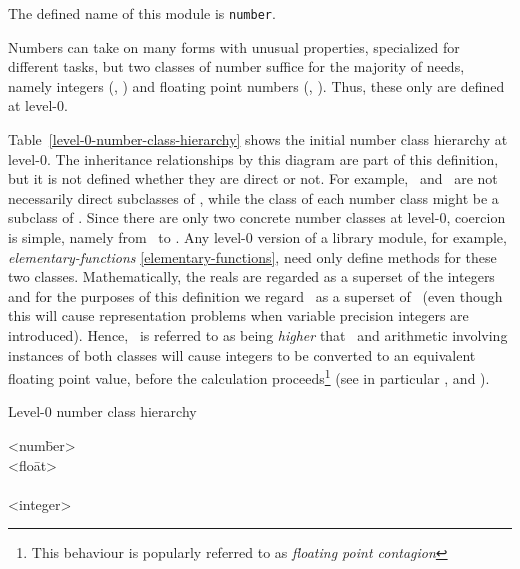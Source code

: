 \begin{optDefinition}
\noindent
The defined name of this module is {\tt number}.

Numbers can take on many forms with unusual properties, specialized for
different tasks, but two classes of number suffice for the majority of needs,
namely integers (, ) and floating point
numbers (, ).  Thus, these only are
defined at level-0.

Table~\ref{level-0-number-class-hierarchy} shows the initial number class
hierarchy at level-0.  The inheritance relationships by this diagram are part of
this definition, but it is not defined whether they are direct or not.  For
example, \ and \ are not necessarily direct
subclasses of , while the class of each number class might be a
subclass of .  Since there are only two concrete number
classes at level-0,
coercion is simple,
namely from \ to .  Any
level-0 version of a library module, for example, {\em elementary-functions}
\ref{elementary-functions}, need only define methods for these two classes.
Mathematically, the reals are regarded as a superset of the integers and for the
purposes of this definition we regard \ as a superset of
\ (even though this will cause representation problems when
variable precision integers are introduced).  Hence, \ is
referred to as being {\em higher} that \ and arithmetic
involving instances of both classes will cause integers to be converted to an
equivalent floating point value, before the calculation proceeds\footnote{This
    behaviour is popularly referred to as {\em floating point contagion}} (see
in particular ,
 and ).

\begin{table}[h]
\caption{Level-0 number class hierarchy}
\label{level-0-number-class-hierarchy}
\begin{center}
{\tt\begin{tabbing}
<num\=ber> \\
    \><flo\=at> \\
    \>     \\
    \><integer> \\
    \>    
\end{tabbing}}
\end{center}
\end{table}


\end{optDefinition}
